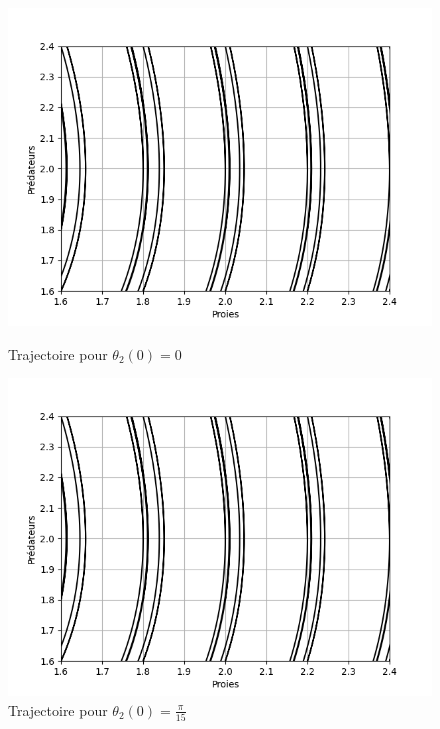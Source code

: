 \begin{figure} [htbp!]
	\begin{minipage}[c]{0.5\textwidth}
		\centering
		\includegraphics[width=\textwidth]{res/behaviour}%
		\caption{Trajectoire pour $ \theta_{2}(0) = 0 $}
		\label{fig:traj_0}
	\end{minipage}\hfill
	\begin{minipage}[c]{0.5\textwidth}
		\centering
		\includegraphics[width=\textwidth]{res/behaviour}%
		\caption{Trajectoire pour $ \theta_{2}(0) = \frac{\pi}{15} $}
		\label{fig:traj_12}
	\end{minipage}
\end{figure}

